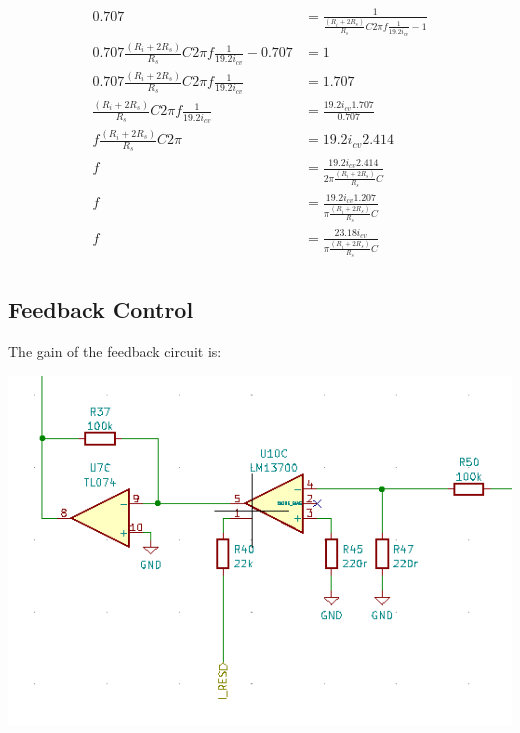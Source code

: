 \documentclass{article}
\begin{document}
\begin{equation*}
\begin{split}
  0.707 & = \frac{1}{\frac{({R_i} + 2{R_s})}{R_s}C2\pi{f}\frac{1}{19.2i_{cv}} - 1} \\
  0.707\frac{({R_i} + 2{R_s})}{R_s}C2\pi{f}\frac{1}{19.2i_{cv}} -  0.707 & = 1 \\
  0.707\frac{({R_i} + 2{R_s})}{R_s}C2\pi{f}\frac{1}{19.2i_{cv}} & = 1.707 \\
  \frac{({R_i} + 2{R_s})}{R_s}C2\pi{f}\frac{1}{19.2i_{cv}} & = \frac{19.2i_{cv}1.707}{0.707} \\
  f\frac{({R_i} + 2{R_s})}{R_s}C2\pi & = 19.2i_{cv}2.414 \\
  f & = \frac{19.2i_{cv}2.414}{2\pi\frac{({R_i} + 2{R_s})}{R_s}C} \\
  f & = \frac{19.2i_{cv}1.207}{\pi\frac{({R_i} + 2{R_s})}{R_s}C} \\
  f & = \frac{23.18i_{cv}}{\pi\frac{({R_i} + 2{R_s})}{R_s}C} \\
\end{split}
\end{equation*}

\subsection{Feedback Control}

The gain of the feedback circuit is:

\includegraphics[width=\linewidth]{images/feedback-amp.png}
\end{document}
